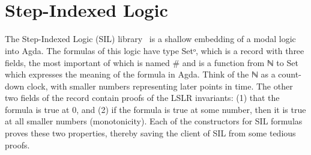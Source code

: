 \begin{code}%
\>[0]\AgdaSpace{}%
\AgdaSymbol{:}\AgdaSpace{}%
\AgdaSymbol{(}\AgdaSpace{}%
\AgdaSpace{}%
\AgdaSymbol{:}\AgdaSpace{}%
\AgdaSymbol{)}\AgdaSpace{}%
\AgdaSpace{}%
\<%
\\
\>[0]\AgdaSpace{}%
\AgdaSpace{}%
\AgdaSpace{}%
\AgdaSymbol{=}\AgdaSpace{}%
\AgdaSymbol{(}\AgdaSpace{}%
\AgdaSpace{}%
\AgdaSpace{}%
\AgdaSpace{}%
\AgdaSymbol{)}\AgdaSpace{}%
\AgdaSpace{}%
\AgdaSymbol{(}\AgdaSpace{}%
\AgdaSpace{}%
\AgdaSpace{}%
\AgdaSpace{}%
\AgdaSymbol{)}\<%
\\
\>[0][@{}l@{\AgdaIndent{0}}]%
\>[4]\AgdaSpace{}%
\AgdaSymbol{(}\AgdaSpace{}%
\AgdaSpace{}%
\AgdaSpace{}%
\AgdaSpace{}%
\AgdaSpace{}%
\AgdaSpace{}%
\AgdaSpace{}%
\AgdaSpace{}%
\AgdaSymbol{)}\AgdaSpace{}%
\AgdaSpace{}%
\AgdaSymbol{(}\AgdaSpace{}%
\AgdaSpace{}%
\AgdaSpace{}%
\AgdaSpace{}%
\AgdaSymbol{)}\AgdaSpace{}%
\AgdaSpace{}%
\AgdaSymbol{(}\AgdaSpace{}%
\AgdaSpace{}%
\AgdaSpace{}%
\AgdaSpace{}%
\AgdaSpace{}%
\AgdaSpace{}%
\AgdaSymbol{)}\<%
\end{code}

\section{Step-Indexed Logic}
\label{sec:SIL}

The Step-Indexed Logic (SIL) library~\cite{Siek:2023aa} is a shallow
embedding of a modal logic into Agda. The formulas of this logic have
type \textsf{Setᵒ}, which is a record with three fields, the most
important of which is named \textsf{\#} and is a function from ℕ to
\textsf{Set} which expresses the meaning of the formula in Agda.
Think of the ℕ as a count-down clock, with smaller numbers
representing later points in time. The other two fields of the record
contain proofs of the LSLR invariants: (1) that the formula is true at
0, and (2) if the formula is true at some number, then it is true at
all smaller numbers (monotonicity). Each of the constructors for SIL
formulas proves these two properties, thereby saving the client of SIL
from some tedious proofs.


